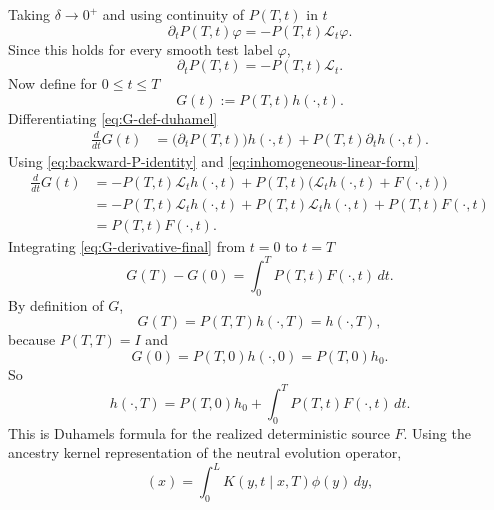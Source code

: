 \documentclass[11pt,a4paper]{report}
\begin{document}
	Taking $\delta\to0^+$ and using continuity of $P(T,t)$ in $t$
	\begin{equation}
		\partial_t P(T,t)\varphi
		=
		-P(T,t)\mathcal L_t\varphi .
	\end{equation}
	Since this holds for every smooth test label $\varphi$,
	\begin{equation}
		\partial_t P(T,t)
		=
		-P(T,t)\mathcal L_t .
		\label{eq:backward-P-identity}
	\end{equation}
	Now define for \(0\le t\le T\)
	\begin{equation}
		G(t):=P(T,t)h(\cdot,t).
		\label{eq:G-def-duhamel}
	\end{equation}
	Differentiating \eqref{eq:G-def-duhamel}
	\begin{align}
		\frac{d}{dt}G(t)
		&=
		\bigl(\partial_t P(T,t)\bigr)h(\cdot,t)
		+
		P(T,t)\partial_t h(\cdot,t).
		\label{eq:G-derivative-step1}
	\end{align}
	Using \eqref{eq:backward-P-identity} and
	\eqref{eq:inhomogeneous-linear-form}
	\begin{align}
		\frac{d}{dt}G(t)
		&=
		-P(T,t)\mathcal L_t h(\cdot,t)
		+
		P(T,t)\bigl(\mathcal L_t h(\cdot,t)+F(\cdot,t)\bigr)  \\
		&=
		-P(T,t)\mathcal L_t h(\cdot,t)
		+
		P(T,t)\mathcal L_t h(\cdot,t)
		+
		P(T,t)F(\cdot,t)  \\
		&=
		P(T,t)F(\cdot,t).
		\label{eq:G-derivative-final}
	\end{align}
	Integrating \eqref{eq:G-derivative-final} from \(t=0\) to \(t=T\)
	\begin{equation}
		G(T)-G(0)
		=
		\int_0^T P(T,t)F(\cdot,t)\,dt .
	\end{equation}
	By definition of \(G\),
	\begin{equation}
		G(T)=P(T,T)h(\cdot,T)=h(\cdot,T),
	\end{equation}
	because \(P(T,T)=I\) and
	\begin{equation}
		G(0)=P(T,0)h(\cdot,0)=P(T,0)h_0 .
	\end{equation}
	So
	\begin{equation}
		h(\cdot,T)
		=
		P(T,0)h_0
		+
		\int_0^T P(T,t)F(\cdot,t)\,dt .
		\label{eq:duhamel-operator}
	\end{equation}
	This is Duhamels formula for the realized deterministic source \(F\).
	Using the ancestry kernel representation of the neutral evolution operator,
	\begin{equation}
		[P(T,t)\phi](x)
		=
		\int_0^L K(y,t\mid x,T)\phi(y)\,dy,
		\label{eq:kernel-def-duhamel}
	\end{equation}
\end{document}
